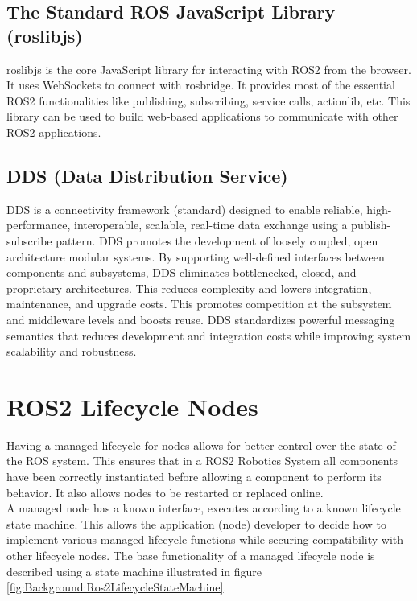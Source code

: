 	\subsection{The Standard ROS JavaScript Library (roslibjs) }
	\label{Grundlagen:ROS2:RosLibJS}
	roslibjs is the core JavaScript library for interacting with ROS2 from the browser. It uses WebSockets to connect with rosbridge. It provides most of the essential ROS2 functionalities like publishing, subscribing, service calls, actionlib, etc. This library can be used to build web-based applications to communicate with other ROS2 applications.
	

	\subsection{DDS (Data Distribution Service)}
	\label{Grundlagen:DDS}
	DDS is a connectivity framework (standard) designed to enable reliable, high-performance, interoperable, scalable, real-time data exchange using a publish-subscribe pattern. DDS promotes the development of loosely coupled, open architecture modular systems. By supporting well-defined interfaces between components and subsystems, DDS eliminates bottlenecked, closed, and proprietary architectures. This reduces complexity and lowers integration, maintenance, and upgrade costs. This promotes competition at the subsystem and middleware levels and boosts reuse. DDS standardizes powerful messaging semantics that reduces development and integration costs while improving system scalability and robustness.\cite{ros2OnDDSRti}
		
	
	\section{ROS2 Lifecycle Nodes}
	\label{Grundlagen:ROS2:Lifecycle}
	Having a managed lifecycle for nodes allows for better control over the state of the ROS system. This ensures that in a ROS2 Robotics System all components have been correctly instantiated before allowing a component to perform its behavior. It also allows nodes to be restarted or replaced online.\\

	A managed node has a known interface, executes according to a known lifecycle state machine. This allows the application (node) developer to decide how to implement various managed lifecycle functions while securing compatibility with other lifecycle nodes.	
	The base functionality of a managed lifecycle node is described using a state machine illustrated in figure \ref{fig:Background:Ros2LifecycleStateMachine}.\\

